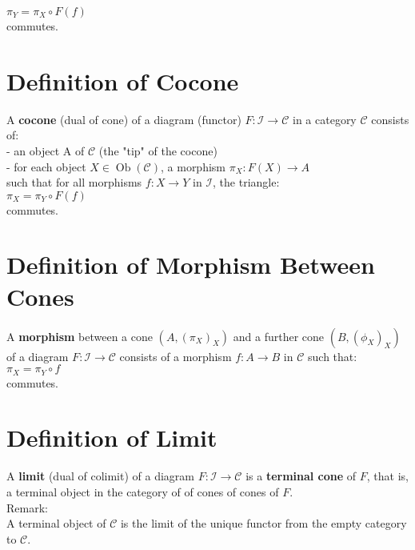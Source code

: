 \documentclass[a4paper, twoside, english, 11pt]{book}
\DeclareMathOperator{\Ob}{Ob}
\newcommand{\C}{\mathcal C}
\newcommand{\I}{\mathcal I}
\begin{document}
$\pi_Y = \pi_X \circ F(f)$ \\

\noindent
commutes.



\section{Definition of Cocone}

A \textbf{cocone} (dual of cone) of a diagram (functor) $F : \I \rightarrow \C$ in a category $\C$ consists of: \\

- an object A of $\C$ (the "tip" of the cocone) \\

- for each object $X \in \Ob(\C)$, a morphism $\pi_X : F(X) \rightarrow A$ \\

\noindent
such that for all morphisms $f: X \rightarrow Y$ in $\I$, the triangle: \\

$\pi_X = \pi_Y \circ F(f)$ \\

\noindent
commutes.



\section{Definition of Morphism Between Cones}

A \textbf{morphism} between a cone $(A, (\pi_X)_X)$ and a further cone $(B, (\phi_X)_X)$ of a diagram $F : \I \rightarrow \C$ consists of a morphism $f : A \rightarrow B$ in $\C$ such that: \\

$\pi_X = \pi_Y \circ f$ \\

\noindent
commutes.



\section{Definition of Limit}

A \textbf{limit} (dual of colimit) of a diagram $F : \I \rightarrow \C$ is a \textbf{terminal cone} of $F$, that is, a terminal object in the category of of cones of cones of $F$. \\

\noindent
Remark: \\
A terminal object of $\C$ is the limit of the unique functor from the empty category to $\C$.
\end{document}
